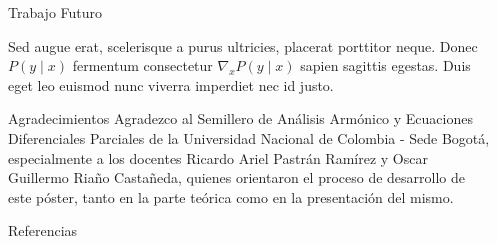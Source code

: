 \documentclass[final]{beamer}
\newlength{\sepwidth}
\newlength{\colwidth}
\newcommand{\separatorcolumn}{\begin{column}{\sepwidth}\end{column}}
\begin{document}
\begin{frame}[t]
\begin{columns}[t]
\begin{column}{\colwidth}
\begin{exampleblock}{Trabajo Futuro}

    Sed augue erat, scelerisque a purus ultricies, placerat porttitor neque.
    Donec $P(y \mid x)$ fermentum consectetur $\nabla_x P(y \mid x)$ sapien
    sagittis egestas. Duis eget leo euismod nunc viverra imperdiet nec id
    justo.

  \end{exampleblock}

  \begin{block}{Agradecimientos}
    Agradezco al Semillero de Análisis Armónico y Ecuaciones Diferenciales Parciales de la Universidad Nacional de Colombia - Sede Bogotá, especialmente a los docentes Ricardo Ariel Pastrán Ramírez y Oscar Guillermo Riaño Castañeda, quienes orientaron el proceso de desarrollo de este póster, tanto en la parte teórica como en la presentación del mismo.
  \end{block}

  \begin{block}{Referencias}

    \nocite{*}
    \footnotesize{
      
      
    }

  \end{block}

\end{column}
\separatorcolumn



\end{columns}
\end{frame}
\end{document}
